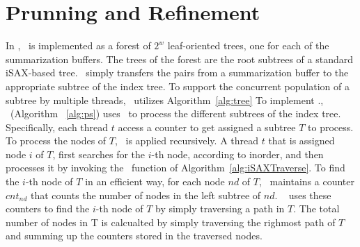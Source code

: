 \section{Prunning and Refinement}

In \Fresh, \PS\ is implemented as a forest of $2^w$ leaf-oriented trees,
one for each of the summarization buffers. 
The trees of the forest are the root subtrees of a standard iSAX-based tree.
\TreePopulation\ simply transfers the pairs from a summarization buffer
to the appropriate subtree of the index tree. 
To support the concurrent population of a subtree by multiple threads, 
\Fresh\ utilizes Algorithm~\ref{alg:tree} 
%
To implement \PS.\Traverse, \Fresh\ (Algorithm ~\ref{alg:ps}) uses \Refresh\ to process 
the different subtrees of the index tree. Specifically, 
each thread $t$ access a counter to get assigned a subtree $T$ to process.
To process the nodes of $T$, \Refresh\ is applied recursively. %
A thread $t$ that is assigned node $i$ of $T$,
first searches for the $i$-th node, according to inorder,
and then processes it by invoking the \Prunning\ function %
of Algorithm~\ref{alg:iSAXTraverse}. 
%
To find the $i$-th node of $T$ in an efficient way, 
for each node $nd$ of $T$, \Fresh\ maintains a counter
$\mathit{cnt_{nd}}$ that counts the number of nodes in the left subtree
of $\mathit{nd}$. \Fresh\ %
uses these counters to find the $i$-th node of $T$ by simply traversing a path in $T$.
The total number of nodes in T is calcualted by simply traversing the righmost path of
$T$ and summing up the counters stored in the traversed nodes.


